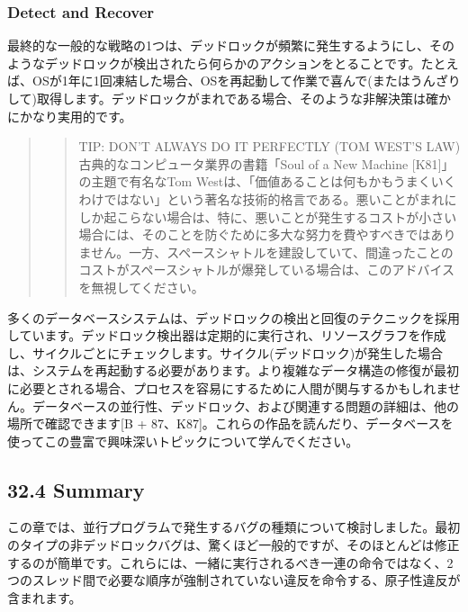\hypertarget{detect-and-recover}{%
\subsubsection*{Detect and Recover}\label{detect-and-recover}}

最終的な一般的な戦略の1つは、デッドロックが頻繁に発生するようにし、そのようなデッドロックが検出されたら何らかのアクションをとることです。たとえば、OSが1年に1回凍結した場合、OSを再起動して作業で喜んで(またはうんざりして)取得します。デッドロックがまれである場合、そのような非解決策は確かにかなり実用的です。

\begin{quote}
\begin{quote}
TIP: DON'T ALWAYS DO IT PERFECTLY (TOM WEST'S LAW)\\
古典的なコンピュータ業界の書籍「Soul of a New Machine
{[}K81{]}」の主題で有名なTom
Westは、「価値あることは何もかもうまくいくわけではない」という著名な技術的格言である。悪いことがまれにしか起こらない場合は、特に、悪いことが発生するコストが小さい場合には、そのことを防ぐために多大な努力を費やすべきではありません。一方、スペースシャトルを建設していて、間違ったことのコストがスペースシャトルが爆発している場合は、このアドバイスを無視してください。
\end{quote}
\end{quote}

多くのデータベースシステムは、デッドロックの検出と回復のテクニックを採用しています。デッドロック検出器は定期的に実行され、リソースグラフを作成し、サイクルごとにチェックします。サイクル(デッドロック)が発生した場合は、システムを再起動する必要があります。より複雑なデータ構造の修復が最初に必要とされる場合、プロセスを容易にするために人間が関与するかもしれません。データベースの並行性、デッドロック、および関連する問題の詳細は、他の場所で確認できます{[}B
+
87、K87{]}。これらの作品を読んだり、データベースを使ってこの豊富で興味深いトピックについて学んでください。

\hypertarget{summary-21}{%
\subsection*{32.4 Summary}\label{summary-21}}

この章では、並行プログラムで発生するバグの種類について検討しました。最初のタイプの非デッドロックバグは、驚くほど一般的ですが、そのほとんどは修正するのが簡単です。これらには、一緒に実行されるべき一連の命令ではなく、2つのスレッド間で必要な順序が強制されていない違反を命令する、原子性違反が含まれます。

